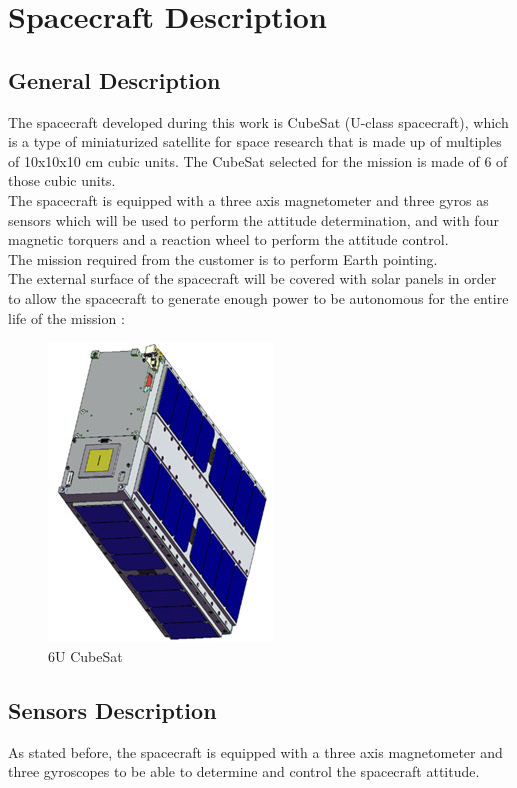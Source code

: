 \documentclass[11pt,a4paper]{report}
\begin{document}
\chapter{Spacecraft Description}

\section{General Description} \label{sec:general}
The spacecraft developed during this work is CubeSat (U-class spacecraft), which is a type of miniaturized satellite for space research that is made up of multiples of 10x10x10 cm cubic units. The CubeSat selected for the mission is made of 6 of those cubic units. \\
The spacecraft is equipped with a three axis magnetometer and three gyros as sensors which will be used to perform the attitude determination, and with four magnetic torquers and a reaction wheel to perform the attitude control.\\
The mission required from the customer is to perform Earth pointing.\\
The external surface of the spacecraft will be covered with solar panels in order to allow the spacecraft to generate enough power to be autonomous for the entire life of the mission : 

\begin{figure}[H]
 	\centering
 	\includegraphics[scale=0.4]{gfx/cubesat_panels.jpg}
    \caption{6U CubeSat}
\end{figure}

\section{Sensors Description}
As stated before, the spacecraft is equipped with a three axis magnetometer and three gyroscopes to be able to determine and control the spacecraft attitude.
\end{document}
